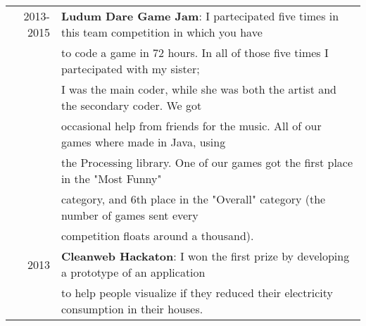 \documentclass[a4paper,10pt]{article} %
\begin{document}
\begin{tabular}{rl}
2013-2015 & \textbf{Ludum Dare Game Jam}: I partecipated five times in this team competition in which you have\\
     & to code a game in 72 hours. In all of those five times I partecipated with my sister;\\
     & I was the main coder, while she was both the artist and the secondary coder. We got \\
     & occasional help from friends for the music. All of our games where made in Java, using \\
     & the Processing library. One of our games got the first place in the "Most Funny" \\
     & category, and 6th place in the "Overall" category (the number of games sent every \\
     & competition floats around a thousand).\\
2013 & \textbf{Cleanweb Hackaton}: I won the first prize by developing a prototype of an application\\
     & to help people visualize if they reduced their electricity consumption in their houses.\\
\end{tabular}



\bigskip
\bigskip
\end{document}
